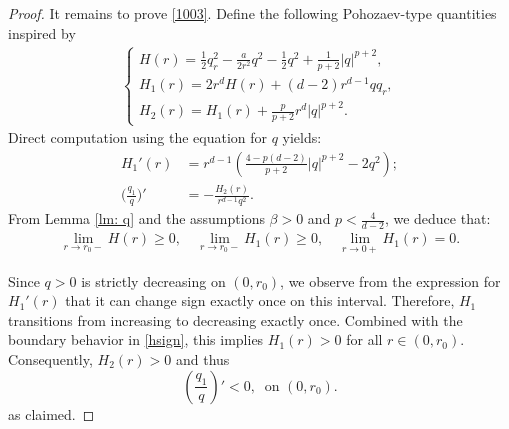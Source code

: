 \documentclass[12pt]{amsart}
\begin{document}
\begin{proof}
    It remains to prove \eqref{1003}. Define the following Pohozaev-type quantities inspired by \cite{P65, Tang03}
          \begin{align}\label{3h}
      \begin{cases}
      H(r)=\frac 12 q_r^2-\frac a{2r^2} q^2-\frac 12 q^2+\frac 1{p+2} |q|^{p+2},\\
      H_1(r)=2r^d H(r)+(d-2)r^{d-1}qq_r,\\
      H_2(r)=H_1(r)+\frac p{p+2} r^d |q|^{p+2}.
      \end{cases}
      \end{align}
 Direct computation using the equation for $q$ yields:
     \begin{align*}
     H_1'(r)&=r^{d-1}(\tfrac{4-p(d-2)}{p+2}|q|^{p+2}-2q^2);\\
     \biggl(\frac{q_1}q\biggr)'&=-\frac{H_2(r)}{r^{d-1}q^2}.
     \end{align*}
 From Lemma \ref{lm: q} %
    and the assumptions $\beta>0$ and $p<\frac 4{d-2}$, we deduce that:
    \begin{align}\label{hsign}
    \lim_{r\to r_0-} H(r) \ge 0, \quad \lim_{r\to r_0-}H_1(r) \ge 0, \quad \lim_{r\to 0+}H_1(r)=0. 
    \end{align}
    
  Since $q>0$ is strictly decreasing on $(0,r_0)$, we observe from the expression for $H_1'(r)$ that it can change sign exactly 
      once 
on this interval. Therefore, $H_1$ transitions from increasing to decreasing exactly once. Combined with the boundary behavior in \eqref{hsign}, this implies $H_1(r)>0$ for all $r\in (0, r_0)$. Consequently, $H_2(r)>0$ and thus 
      \[
       (\frac{q_1}q)'<0, \ \mbox{ on }(0,r_0). 
       \] 
              as claimed. 
  \end{proof} 
   
\end{document}
